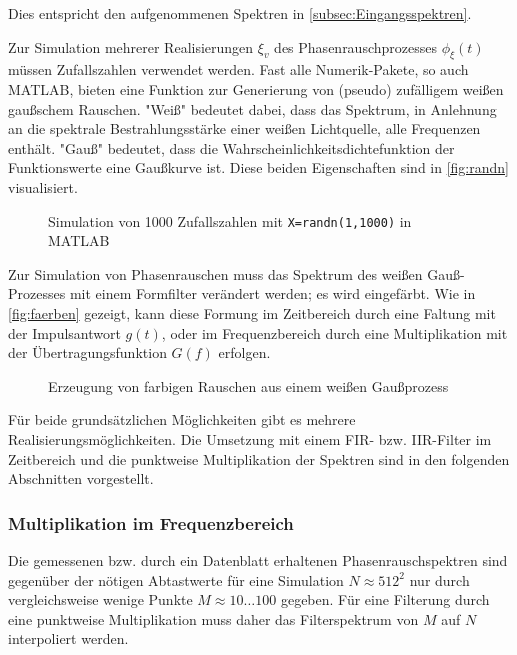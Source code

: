Dies entspricht den aufgenommenen Spektren in \autoref{subsec:Eingangsspektren}.

Zur Simulation mehrerer Realisierungen $\xi_v$ des Phasenrauschprozesses $\phi_\xi(t)$ müssen Zufallszahlen verwendet werden. Fast alle Numerik-Pakete, so auch MATLAB, bieten eine Funktion zur Generierung von (pseudo) zufälligem weißen gaußschem Rauschen. "Weiß" bedeutet dabei, dass das Spektrum, in Anlehnung an die spektrale Bestrahlungsstärke einer weißen Lichtquelle, alle Frequenzen enthält. "Gauß" bedeutet, dass die Wahrscheinlichkeitsdichtefunktion der Funktionswerte eine Gaußkurve ist. Diese beiden Eigenschaften sind in \autoref{fig:randn} visualisiert.

\begin{figure}[H]
	\centering
	\hfill
	\caption[MATLAB randn]{Simulation von 1000 Zufallszahlen mit \texttt{X=randn(1,1000)} in MATLAB}
	\label{fig:randn}
\end{figure}

Zur Simulation von Phasenrauschen muss das Spektrum des weißen Gauß-Prozesses mit einem Formfilter verändert werden; es wird eingefärbt. Wie in \autoref{fig:faerben} gezeigt, kann diese Formung im Zeitbereich durch eine Faltung mit der Impulsantwort $g(t)$, oder im Frequenzbereich durch eine Multiplikation mit der Übertragungsfunktion $G(f)$ erfolgen.

\begin{figure}[H]
	\centering
	\caption[Erzeugen von farbigem Rauschen]{Erzeugung von farbigen Rauschen aus einem weißen Gaußprozess}
	\label{fig:faerben}
\end{figure}

Für beide grundsätzlichen Möglichkeiten gibt es mehrere Realisierungsmöglichkeiten. Die Umsetzung mit einem FIR- bzw. IIR-Filter im Zeitbereich und die punktweise Multiplikation der Spektren sind in den folgenden Abschnitten vorgestellt.

\subsubsection{Multiplikation im Frequenzbereich}
Die gemessenen bzw. durch ein Datenblatt erhaltenen Phasenrauschspektren sind gegenüber der nötigen Abtastwerte für eine Simulation $N\approx512^2$ nur durch vergleichsweise wenige Punkte $M\approx10 \dots 100$ gegeben. Für eine Filterung durch eine punktweise Multiplikation muss daher das Filterspektrum von $M$ auf $N$ interpoliert werden.

